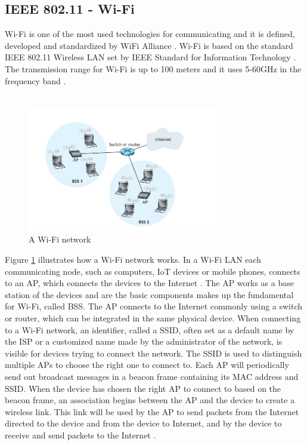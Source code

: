 \subsection{IEEE 802.11 - \gls{Wi-Fi}}
\gls{Wi-Fi} \cite{WiFiAlliance} is one of the most used technologies for communicating and it is defined, developed and standardized by WiFi Alliance \cite{WiFiAlliance}. \gls{Wi-Fi} is based on the standard IEEE 802.11 Wireless LAN set by IEEE Standard for Information Technology \cite{WifiStandard}. The transmission range for \gls{Wi-Fi} is up to 100 meters and it uses 5-60GHz in the frequency band \cite{IAQMonitorCommunicationReview}.
\\\\
\begin{figure} [!ht]
    \centering
    \includegraphics[width=0.75\textwidth]{figures/WiFiStandard.png}
    \caption{A \gls{Wi-Fi} network \cite{Datacom}}
    \label{fig:WiFiStandard}
\end{figure}
Figure \ref{fig:WiFiStandard} illustrates how a \gls{Wi-Fi} network works. In a \gls{Wi-Fi} \gls{LAN} each communicating node, such as computers, \gls{IoT} devices or mobile phones, connects to an \gls{AP}, which connects the devices to the Internet \cite{Datacom}. The \gls{AP} works as a base station of the devices and are the basic components makes up the fundamental for \gls{Wi-Fi}, called \gls{BSS}. The \gls{AP} connects to the Internet commonly using a switch or router, which can be integrated in the same physical device. When connecting to a \gls{Wi-Fi} network, an identifier, called a \gls{SSID}, often set as a default name by the \gls{ISP} or a customized name made by the administrator of the network, is visible for devices trying to connect the network. The \gls{SSID} is used to distinguish multiple \gls{AP}s to choose the right one to connect to. Each \gls{AP} will periodically send out broadcast messages in a beacon frame containing its \gls{MAC} address and \gls{SSID}. When the device has chosen the right \gls{AP} to connect to based on the beacon frame, an association begins between the \gls{AP} and the device to create a wireless link. This link will be used by the \gls{AP} to send packets from the Internet directed to the device and from the device to Internet, and by the device to receive and send packets to the Internet \cite{Datacom}. 

